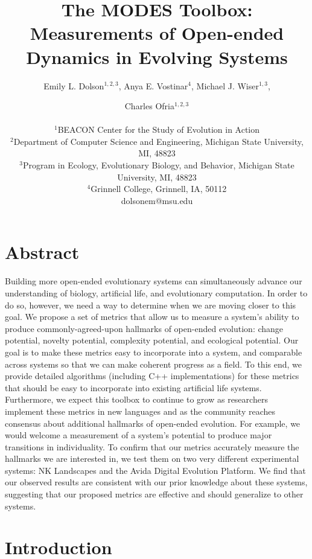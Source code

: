 \documentclass[letterpaper]{article}
\title{The MODES Toolbox: Measurements of Open-ended Dynamics in Evolving Systems}
\author{Emily L. Dolson$^{1,2,3}$, Anya E. Vostinar$^{4}$, Michael J. Wiser$^{1,3}$,\and Charles Ofria$^{1,2,3}$ \\
\mbox{}\\
$^1$BEACON Center for the Study of Evolution in Action  \\
$^2$Department of Computer Science and Engineering, Michigan State University, MI, 48823 \\
$^3$Program in Ecology, Evolutionary Biology, and Behavior, Michigan State University, MI, 48823 \\
$^4$Grinnell College, Grinnell, IA, 50112 \\
dolsonem@msu.edu}
\begin{document}
\maketitle

\section{Abstract}

Building more open-ended evolutionary systems can simultaneously advance our understanding of biology, artificial life, and evolutionary computation. In order to do so, however, we need a way to determine when we are moving closer to this goal. We propose a set of metrics that allow us to measure a system's ability to produce commonly-agreed-upon hallmarks of open-ended evolution: change potential, novelty potential, complexity potential, and ecological potential. Our goal is to make these metrics easy to incorporate into a system, and comparable across systems so that we can make coherent progress as a field. To this end, we provide detailed algorithms (including C++ implementations) for these metrics that should be easy to incorporate into existing artificial life systems. Furthermore, we expect this toolbox to continue to grow as researchers implement these metrics in new languages and as the community reaches consensus about additional hallmarks of open-ended evolution. %
For example, we would welcome a measurement of a system's potential to produce major transitions in individuality. To confirm that our metrics accurately measure the hallmarks we are interested in, we test them on two very different experimental systems: NK Landscapes and the Avida Digital Evolution Platform. We find that our observed results are consistent with our prior knowledge about these systems, suggesting that our proposed metrics are effective and should generalize to other systems.

\section{Introduction}
\end{document}

